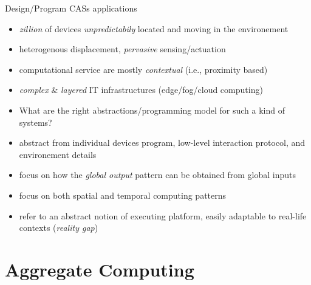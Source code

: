 \documentclass[8pt, aspectratio=169, handout]{beamer}
\begin{document}
\begin{frame}{Design/Program CASs applications}
  \begin{alarm}
    \begin{itemize}
      \item \emph{zillion} of devices \emph{unpredictabily} located and moving in the environement
      \item heterogenous displacement, \emph{pervasive} sensing/actuation
      \item computational service are mostly \emph{contextual} (i.e., proximity based)
      \item \emph{complex} \& \emph{layered} IT infrastructures (edge/fog/cloud computing)
      \item[\faArrowRight] What are the right abstractions/programming model for such a kind of systems?
    \end{itemize}
  \end{alarm}
  \begin{card}
    \begin{itemize}
      \item[\faThumbsUp] abstract from individual devices program, low-level interaction protocol, and environement details
      \item[\faThumbsUp] focus on how the \emph{global output} pattern can be obtained from global
      inputs
      \item[\faThumbsUp] focus on both spatial and temporal computing patterns
      \item[\faThumbsUp] refer to an abstract notion of executing platform, easily adaptable to
      real-life contexts (\emph{reality gap}) 
    \end{itemize}
  \end{card}
\end{frame}
\section{Aggregate Computing}
\end{document}
